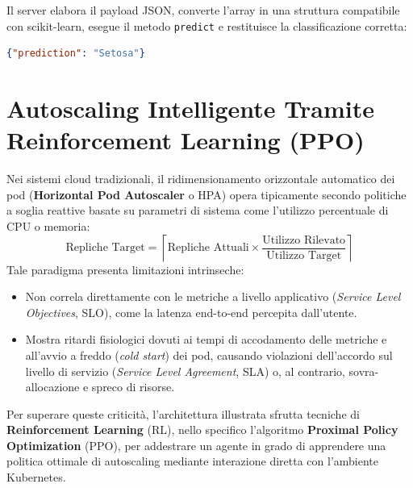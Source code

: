 \documentclass[11pt, a4paper]{article}
\begin{document}
Il server elabora il payload JSON, converte l'array in una struttura compatibile con scikit-learn, esegue il metodo \texttt{predict} e restituisce la classificazione corretta:

\begin{lstlisting}[language=json]
{"prediction": "Setosa"}
\end{lstlisting}

\newpage


\section{Autoscaling Intelligente Tramite Reinforcement Learning (PPO)}

Nei sistemi cloud tradizionali, il ridimensionamento orizzontale automatico dei pod (\textbf{Horizontal Pod Autoscaler} o HPA) opera tipicamente secondo politiche a soglia reattive basate su parametri di sistema come l'utilizzo percentuale di CPU o memoria:
\[
\text{Repliche Target} = \left\lceil \text{Repliche Attuali} \times \frac{\text{Utilizzo Rilevato}}{\text{Utilizzo Target}} \right\rceil
\]
Tale paradigma presenta limitazioni intrinseche:
\begin{itemize}[noitemsep]
    \item Non correla direttamente con le metriche a livello applicativo (\emph{Service Level Objectives}, SLO), come la latenza end-to-end percepita dall'utente.
    \item Mostra ritardi fisiologici dovuti ai tempi di accodamento delle metriche e all'avvio a freddo (\emph{cold start}) dei pod, causando violazioni dell'accordo sul livello di servizio (\emph{Service Level Agreement}, SLA) o, al contrario, sovra-allocazione e spreco di risorse.
\end{itemize}

Per superare queste criticità, l'architettura illustrata sfrutta tecniche di \textbf{Reinforcement Learning} (RL), nello specifico l'algoritmo \textbf{Proximal Policy Optimization} (PPO), per addestrare un agente in grado di apprendere una politica ottimale di autoscaling mediante interazione diretta con l'ambiente Kubernetes.

\end{document}
